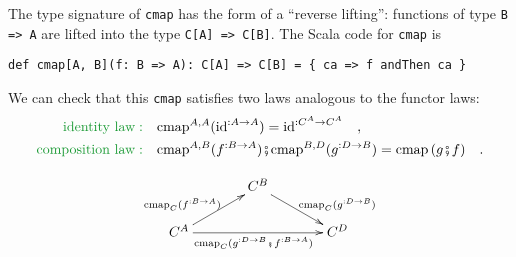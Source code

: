 The type signature of \lstinline!cmap! has the form of a \textsf{``}reverse
lifting\textsf{''}: functions of type \lstinline!B => A! are lifted into
the type \lstinline!C[A] => C[B]!. The Scala code for \lstinline!cmap!
is
\begin{lstlisting}
def cmap[A, B](f: B => A): C[A] => C[B] = { ca => f andThen ca } 
\end{lstlisting}
We can check that this \lstinline!cmap! satisfies two laws analogous
to the functor laws:
\begin{align*}
{\color{greenunder}\text{identity law}:}\quad & \text{cmap}^{A,A}(\text{id}^{:A\rightarrow A})=\text{id}^{:C^{A}\rightarrow C^{A}}\quad,\\
{\color{greenunder}\text{composition law}:}\quad & \text{cmap}^{A,B}(f^{:B\rightarrow A})\bef\text{cmap}^{B,D}(g^{:D\rightarrow B})=\text{cmap}\,(g\bef f)\quad.
\end{align*}

\begin{wrapfigure}{l}{0.4\columnwidth}%
\vspace{-2\baselineskip}
\[
\xymatrix{\xyScaleY{1.5pc}\xyScaleX{3pc} & C^{B}\ar[rd]\sp(0.6){\ ~\text{cmap}_{C}(g^{:D\rightarrow B})}\\
C^{A}\ar[ru]\sp(0.4){\text{cmap}_{C}(f^{:B\rightarrow A})\ }\ar[rr]\sb(0.5){\text{cmap}_{C}(g^{:D\rightarrow B}\bef f^{:B\rightarrow A})\ ~} &  & C^{D}
}
\]

\vspace{-2\baselineskip}
\end{wrapfigure}%

